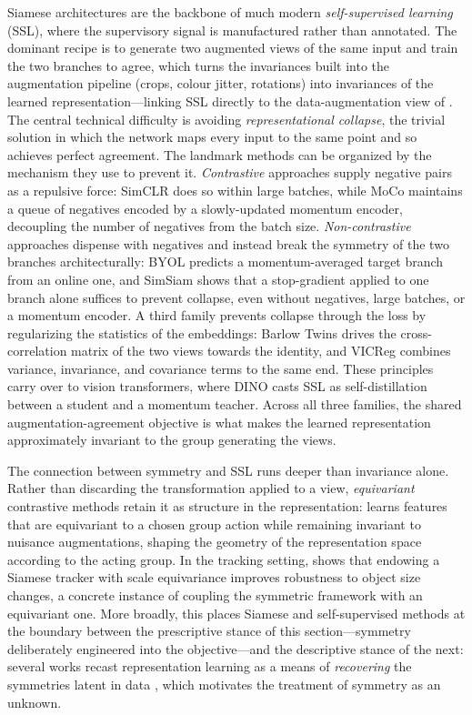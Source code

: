 \documentclass[mathematics,review,submit,moreauthors]{Definitions/mdpi}
\begin{document}
Siamese architectures are the backbone of much modern \emph{self-supervised learning} (SSL), where the supervisory signal is manufactured rather than annotated.
The dominant recipe is to generate two augmented views of the same input and train the two branches to agree, which turns the invariances built into the augmentation pipeline (crops, colour jitter, rotations) into invariances of the learned representation---linking SSL directly to the data-augmentation view of .
The central technical difficulty is avoiding \emph{representational collapse}, the trivial solution in which the network maps every input to the same point and so achieves perfect agreement.
The landmark methods can be organized by the mechanism they use to prevent it.
\emph{Contrastive} approaches supply negative pairs as a repulsive force: SimCLR \cite{chen2020simclr} does so within large batches, while MoCo \cite{he2020moco} maintains a queue of negatives encoded by a slowly-updated momentum encoder, decoupling the number of negatives from the batch size.
\emph{Non-contrastive} approaches dispense with negatives and instead break the symmetry of the two branches architecturally: BYOL \cite{grill2020byol} predicts a momentum-averaged target branch from an online one, and SimSiam \cite{chen2020a} shows that a stop-gradient applied to one branch alone suffices to prevent collapse, even without negatives, large batches, or a momentum encoder.
A third family prevents collapse through the loss by regularizing the statistics of the embeddings: Barlow Twins \cite{zbontar2021barlow} drives the cross-correlation matrix of the two views towards the identity, and VICReg \cite{bardes2022vicreg} combines variance, invariance, and covariance terms to the same end.
These principles carry over to vision transformers, where DINO \cite{caron2021dino} casts SSL as self-distillation between a student and a momentum teacher.
Across all three families, the shared augmentation-agreement objective is what makes the learned representation approximately invariant to the group generating the views.

The connection between symmetry and SSL runs deeper than invariance alone.
Rather than discarding the transformation applied to a view, \emph{equivariant} contrastive methods retain it as structure in the representation: \cite{gupta2023a} learns features that are equivariant to a chosen group action while remaining invariant to nuisance augmentations, shaping the geometry of the representation space according to the acting group.
In the tracking setting, \cite{sosnovik20212iwcacvw} shows that endowing a Siamese tracker with scale equivariance improves robustness to object size changes, a concrete instance of coupling the symmetric framework with an equivariant one.
More broadly, this places Siamese and self-supervised methods at the boundary between the prescriptive stance of this section---symmetry deliberately engineered into the objective---and the descriptive stance of the next: several works recast representation learning as a means of \emph{recovering} the symmetries latent in data \cite{perin2025}, which motivates the treatment of symmetry as an unknown.
\end{document}

